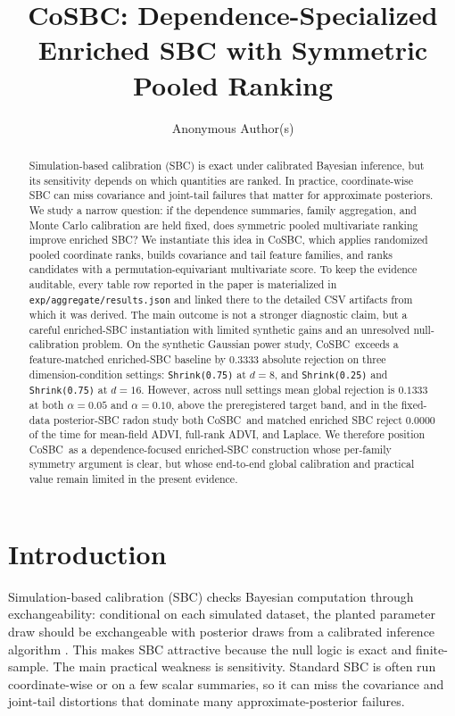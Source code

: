 \documentclass[10pt,twocolumn]{article}
\title{CoSBC: Dependence-Specialized Enriched SBC with Symmetric Pooled Ranking}
\author{Anonymous Author(s)}
\date{}
\newcommand{\method}{CoSBC}
\newcommand{\1}{\mathbf{1}}
\begin{document}
\maketitle

\begin{abstract}
Simulation-based calibration (SBC) is exact under calibrated Bayesian inference, but its sensitivity depends on which quantities are ranked. In practice, coordinate-wise SBC can miss covariance and joint-tail failures that matter for approximate posteriors. We study a narrow question: if the dependence summaries, family aggregation, and Monte Carlo calibration are held fixed, does symmetric pooled multivariate ranking improve enriched SBC? We instantiate this idea in \method, which applies randomized pooled coordinate ranks, builds covariance and tail feature families, and ranks candidates with a permutation-equivariant multivariate score. To keep the evidence auditable, every table row reported in the paper is materialized in \texttt{exp/aggregate/results.json} and linked there to the detailed CSV artifacts from which it was derived. The main outcome is not a stronger diagnostic claim, but a careful enriched-SBC instantiation with limited synthetic gains and an unresolved null-calibration problem. On the synthetic Gaussian power study, \method\ exceeds a feature-matched enriched-SBC baseline by $0.3333$ absolute rejection on three dimension-condition settings: \texttt{Shrink(0.75)} at $d=8$, and \texttt{Shrink(0.25)} and \texttt{Shrink(0.75)} at $d=16$. However, across null settings mean global rejection is $0.1333$ at both $\alpha=0.05$ and $\alpha=0.10$, above the preregistered target band, and in the fixed-data posterior-SBC radon study both \method\ and matched enriched SBC reject $0.0000$ of the time for mean-field ADVI, full-rank ADVI, and Laplace. We therefore position \method\ as a dependence-focused enriched-SBC construction whose per-family symmetry argument is clear, but whose end-to-end global calibration and practical value remain limited in the present evidence.
\end{abstract}

\section{Introduction}
Simulation-based calibration (SBC) checks Bayesian computation through exchangeability: conditional on each simulated dataset, the planted parameter draw should be exchangeable with posterior draws from a calibrated inference algorithm \cite{Talts2018}. This makes SBC attractive because the null logic is exact and finite-sample. The main practical weakness is sensitivity. Standard SBC is often run coordinate-wise or on a few scalar summaries, so it can miss the covariance and joint-tail distortions that dominate many approximate-posterior failures.
\end{document}
